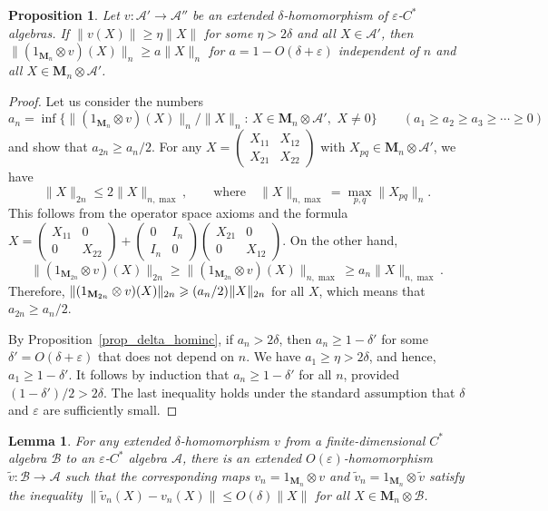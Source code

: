 \documentclass[12pt]{article}
\newcommand{\calA}{\mathcal{A}}
\newcommand{\calB}{\mathcal{B}}
\newcommand{\ts}{\mkern1mu}
\newcommand*{\Ma}[1]{\mathbf{M}_{#1}}
\newcommand{\eps}{\varepsilon}
\renewcommand{\le}{\leqslant}
\renewcommand{\ge}{\geqslant}
\newtheorem{Proposition}[Theorem]{Proposition}
\newtheorem{Lemma}[Theorem]{Lemma}
\newtheorem[definition]{Definition}[Theorem]{Definition}
\newtheorem[remark]{Example}[Theorem]{Example}
\newtheorem[remark]{Remark}[Theorem]{Remark}
\newtheorem[remark]{Question}[Theorem]{Open question}
\newtheorem*[definition]{definition}{Definition}
\newtheorem*[remark]{example}{Example}
\newtheorem*[remark]{remark}{Remark}
\newtheorem*[remark]{question}{Open question}
\numberwithin{equation}{section}
\begin{document}
\begin{Proposition}\label{prop_inc_ext}
Let $v\colon\calA'\to\calA''$ be an extended $\delta$-homomorphism of $\eps$-$C^*$ algebras. If $\|v(X)\|\ge\eta\|X\|$ for some $\eta>2\delta$ and all $X\in\calA'$, then $\|(1_{\Ma{n}}\otimes v)(X)\|_n\ge a\|X\|_n$ for $a=1-O(\delta+\eps)$ independent of $n$ and all $X\in\Ma{n}\otimes\calA'$.
\end{Proposition}
\begin{proof}
Let us consider the numbers
\[
a_n=\inf\bigl\{\|(1_{\Ma{n}}\otimes v)(X)\|_n/\|X\|_n:\,
X\in\Ma{n}\otimes\calA',\,\, X\not=0\bigr\}\qquad
(a_1\ge a_2\ge a_3\ge\cdots\ge 0)
\]
and show that $a_{2n}\ge a_{n}/2$. For any $X=\left(\begin{smallmatrix}X_{11}&X_{12}\\ X_{21}&X_{22}\end{smallmatrix}\right)$ with $X_{pq}\in\Ma{n}\otimes\calA'$, we have
\[
\|X\|_{2n}\le 2\|X\|_{n,\max},\qquad
\text{where}\quad \|X\|_{n,\max}=\max_{p,q}\|X_{pq}\|_n.
\]
This follows from the operator space axioms and the formula $X=\left(\begin{smallmatrix}X_{11}&0\\ 0&X_{22}\end{smallmatrix}\right) +\left(\begin{smallmatrix}0&I_n\\ I_n&0\end{smallmatrix}\right) \left(\begin{smallmatrix}X_{21}&0\\ 0&X_{12}\end{smallmatrix}\right)$. On the other hand,
\[
\|(1_{\Ma{2n}}\otimes v)(X)\|_{2n}\ge \|(1_{\Ma{2n}}\otimes v)(X)\|_{n,\max}
\ge a_n\|X\|_{n,\max}.
\]
Therefore, $\|(1_{\Ma{2n}}\otimes v)(X)\|_{2n}\ge (a_n/2)\ts\|X\|_{2n}$ for all $X$, which means that $a_{2n}\ge a_{n}/2$.

By Proposition~\ref{prop_delta_hominc}, if $a_n>2\delta$, then $a_n\ge 1-\delta'$ for some $\delta'=O(\delta+\eps)$ that does not depend on $n$. We have $a_1\ge\eta>2\delta$, and hence, $a_1\ge 1-\delta'$. It follows by induction that $a_n\ge 1-\delta'$ for all $n$, provided $(1-\delta')/2>2\delta$. The last inequality holds under the standard assumption that $\delta$ and $\eps$ are sufficiently small.
\end{proof}

\begin{Lemma}\label{lem_approx_ext}
For any extended $\delta$-homomorphism $v$ from a finite-dimensional $C^*$ algebra $\calB$ to an $\eps$-$C^*$ algebra $\calA$, there is an extended $O(\eps)$-homomorphism $\tilde{v}\colon \calB\to\calA$ such that the corresponding maps $v_n=1_{\Ma{n}}\otimes v$ and $\tilde{v}_n=1_{\Ma{n}}\otimes\tilde{v}$ satisfy the inequality  $\bigl\|\tilde{v}_n(X)-v_n(X)\|\le O(\delta)\|X\|$ for all $X\in\Ma{n}\otimes\calB$.
\end{Lemma}
\end{document}
